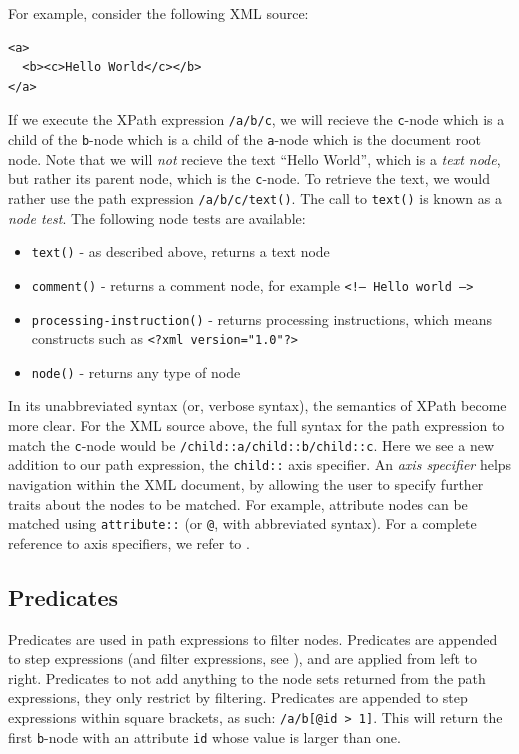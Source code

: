 For example, consider the following XML source:
\begin{Verbatim}
<a>
  <b><c>Hello World</c></b>
</a>
\end{Verbatim}
If we execute the XPath expression \verb!/a/b/c!, we will recieve the
\verb!c!-node which is a child of the \verb!b!-node which is a child of the
\verb!a!-node which is the document root node. Note that we will \textit{not}
recieve the text ``Hello World'', which is a \textit{text node}, but rather its
parent node, which is the \verb!c!-node. To retrieve the text, we would rather
use the path expression \verb!/a/b/c/text()!. The call to \verb!text()! is
known as a \textit{node test}. The following node tests are available:
\begin{itemize}
  \item \verb!text()! - as described above, returns a text node
  \item \verb!comment()! - returns a comment node, for example \texttt{<!-- Hello
  world -->}
  \item \verb!processing-instruction()! - returns processing instructions, which
  means constructs such as \texttt{<?xml version="1.0"?>}
  \item \verb!node()! - returns any type of node 
\end{itemize} 

In its unabbreviated syntax (or, verbose syntax), the semantics of XPath
become more clear. For the XML source above, the full syntax for the path
expression to match the \verb!c!-node would be
\texttt{/child::a/child::b/child::c}. Here we see a new addition to our path
expression, the \verb!child::! axis specifier. An \textit{axis specifier} helps
navigation within the XML document, by allowing the user to specify further
traits about the nodes to be matched. For example, attribute nodes can be
matched using \verb!attribute::! (or \verb!@!, with abbreviated syntax). For a
complete reference to axis specifiers, we refer to \cite{w3c01}.

\subsection{Predicates}
\label{sect:theory:xquery:Predicates}
Predicates are used in path expressions to filter nodes. Predicates are
appended to step expressions (and filter expressions, see \cite{w3c01}), and
are applied from left to right. Predicates to not add anything to the node sets
returned from the path expressions, they only restrict by filtering. Predicates
are appended to step expressions within square brackets, as such:
\verb!/a/b[@id > 1]!. This will return the first \verb!b!-node with an
attribute \verb!id! whose value is larger than one.

